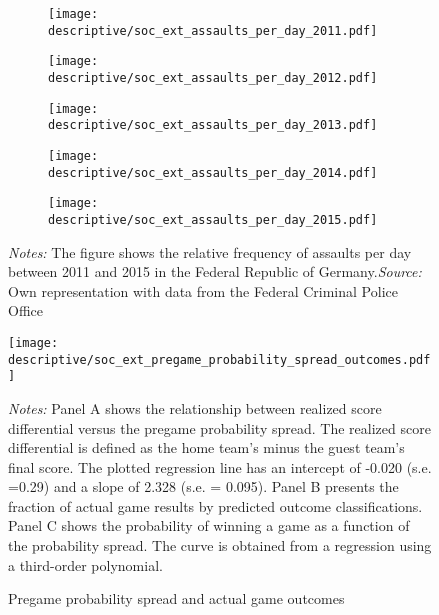 \documentclass[11pt, a4paper]{article} %
\begin{document}
\vspace*{\fill}
\begin{figure}[H]\centering
	\caption{Distribution of assaults across days of the year, per year}\label{fig_soc_ext:assault_year_distribution}
	\begin{subfigure}[h]{0.48\linewidth}\centering
		\texttt{[image: descriptive/soc\_ext\_assaults\_per\_day\_2011.pdf]}
	\end{subfigure}
	\begin{subfigure}[h]{0.48\linewidth}\centering
		\texttt{[image: descriptive/soc\_ext\_assaults\_per\_day\_2012.pdf]}
	\end{subfigure}\begin{subfigure}[h]{0.48\linewidth}\centering
		\texttt{[image: descriptive/soc\_ext\_assaults\_per\_day\_2013.pdf]}
	\end{subfigure}
	\begin{subfigure}[h]{0.48\linewidth}\centering
		\texttt{[image: descriptive/soc\_ext\_assaults\_per\_day\_2014.pdf]}
	\end{subfigure}
	\begin{subfigure}[h]{0.48\linewidth}\centering
		\texttt{[image: descriptive/soc\_ext\_assaults\_per\_day\_2015.pdf]}
	\end{subfigure}
	\begin{minipage}{\linewidth}
		\scriptsize{\emph{Notes:} The figure shows the relative frequency of assaults per day between 2011 and 2015 in the Federal Republic of Germany.\newline \emph{Source:} Own representation with data from the Federal Criminal Police Office}
	\end{minipage}
\end{figure}
\vspace*{\fill}\clearpage
\vspace*{\fill}
\begin{figure}[H]\centering
	\caption{Pregame probability spread and actual game outcomes}\label{fig_soc_ext:pregame_probability_spread_outcomes}
	\texttt{[image: descriptive/soc\_ext\_pregame\_probability\_spread\_outcomes.pdf]}
	\scriptsize
	\begin{minipage}{\linewidth}
		\emph{Notes:} Panel A shows the relationship between realized score differential versus the pregame probability spread. The realized score differential is defined as the home team's minus the guest team's final score. The plotted regression line has an intercept of -0.020 (s.e. =0.29) and a slope of 2.328 (s.e. = 0.095). Panel B presents the fraction of actual game results by predicted outcome classifications. Panel C shows the probability of winning a game as a function of the probability spread. The curve is obtained from a regression using a third-order polynomial.
	\end{minipage}
\end{figure}
\vspace*{\fill}\clearpage
\end{document}
